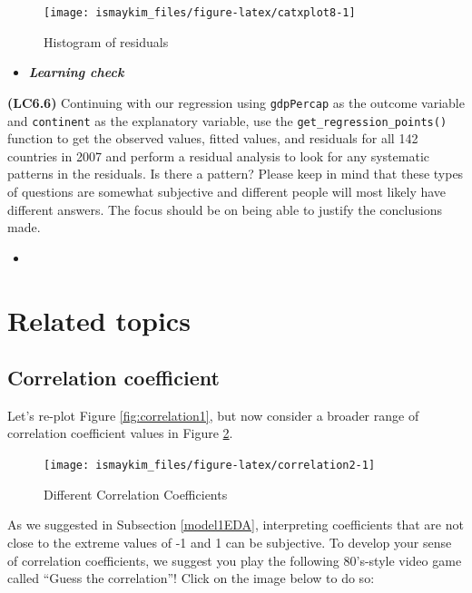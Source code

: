 \documentclass[12pt,]{krantz}
\newenvironment{rmdblock}[1]
  {\begin{shaded*}
  \begin{itemize}
  \renewcommand{\labelitemi}{
    \raisebox{-.7\height}[0pt][0pt]{
    }
  }
  \item
  }
  {
  \end{itemize}
  \end{shaded*}
  }
\newenvironment{learncheck}
  {\begin{rmdblock}{warning}}
  {\end{rmdblock}}
\theoremstyle{definition}
\theoremstyle{definition}
\theoremstyle{definition}
\theoremstyle{remark}
\begin{document}
\begin{figure}

{\centering \texttt{[image: ismaykim\_files/figure-latex/catxplot8-1]} 

}

\caption{Histogram of residuals}\label{fig:catxplot8}
\end{figure}

\begin{learncheck}
\textbf{\emph{Learning check}}
\end{learncheck}

\textbf{(LC6.6)} Continuing with our regression using \texttt{gdpPercap}
as the outcome variable and \texttt{continent} as the explanatory
variable, use the \texttt{get\_regression\_points()} function to get the
observed values, fitted values, and residuals for all 142 countries in
2007 and perform a residual analysis to look for any systematic patterns
in the residuals. Is there a pattern? Please keep in mind that these
types of questions are somewhat subjective and different people will
most likely have different answers. The focus should be on being able to
justify the conclusions made.

\begin{learncheck}

\end{learncheck}

\section{Related topics}\label{related-topics}

\subsection{Correlation coefficient}\label{correlationcoefficient}

Let's re-plot Figure \ref{fig:correlation1}, but now consider a broader
range of correlation coefficient values in Figure
\ref{fig:correlation2}.

\begin{figure}

{\centering \texttt{[image: ismaykim\_files/figure-latex/correlation2-1]} 

}

\caption{Different Correlation Coefficients}\label{fig:correlation2}
\end{figure}

As we suggested in Subsection \ref{model1EDA}, interpreting coefficients
that are not close to the extreme values of -1 and 1 can be subjective.
To develop your sense of correlation coefficients, we suggest you play
the following 80's-style video game called ``Guess the correlation''!
Click on the image below to do so:
\end{document}
